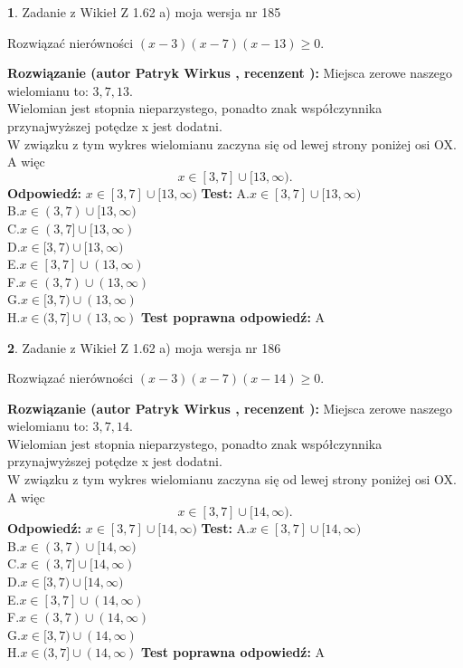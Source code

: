 \documentclass[12pt, a4paper]{article}
\theoremstyle{definition} %
\newtheorem{zad}{}
\newcommand{\zadStart}[1]{\begin{zad}#1\newline}
\newcommand{\zadStop}{\end{zad}}
\newcommand{\rozwStart}[2]{\noindent \textbf{Rozwiązanie (autor #1 , recenzent #2): }\newline}
\newcommand{\rozwStop}{\newline}
\newcommand{\odpStart}{\noindent \textbf{Odpowiedź:}\newline}
\newcommand{\odpStop}{\newline}
\newcommand{\testStart}{\noindent \textbf{Test:}\newline}
\newcommand{\testStop}{\newline}
\newcommand{\kluczStart}{\noindent \textbf{Test poprawna odpowiedź:}\newline}
\newcommand{\kluczStop}{\newline}
\begin{document}
\zadStart{Zadanie z Wikieł Z 1.62 a) moja wersja nr 185}

Rozwiązać nierówności $(x-3)(x-7)(x-13)\ge0$.
\zadStop
\rozwStart{Patryk Wirkus}{}
Miejsca zerowe naszego wielomianu to: $3, 7, 13$.\\
Wielomian jest stopnia nieparzystego, ponadto znak współczynnika przy\linebreak najwyższej potędze x jest dodatni.\\ W związku z tym wykres wielomianu zaczyna się od lewej strony poniżej osi OX. A więc $$x \in [3,7] \cup [13,\infty).$$
\rozwStop
\odpStart
$x \in [3,7] \cup [13,\infty)$
\odpStop
\testStart
A.$x \in [3,7] \cup [13,\infty)$\\
B.$x \in (3,7) \cup [13,\infty)$\\
C.$x \in (3,7] \cup [13,\infty)$\\
D.$x \in [3,7) \cup [13,\infty)$\\
E.$x \in [3,7] \cup (13,\infty)$\\
F.$x \in (3,7) \cup (13,\infty)$\\
G.$x \in [3,7) \cup (13,\infty)$\\
H.$x \in (3,7] \cup (13,\infty)$
\testStop
\kluczStart
A
\kluczStop



\zadStart{Zadanie z Wikieł Z 1.62 a) moja wersja nr 186}

Rozwiązać nierówności $(x-3)(x-7)(x-14)\ge0$.
\zadStop
\rozwStart{Patryk Wirkus}{}
Miejsca zerowe naszego wielomianu to: $3, 7, 14$.\\
Wielomian jest stopnia nieparzystego, ponadto znak współczynnika przy\linebreak najwyższej potędze x jest dodatni.\\ W związku z tym wykres wielomianu zaczyna się od lewej strony poniżej osi OX. A więc $$x \in [3,7] \cup [14,\infty).$$
\rozwStop
\odpStart
$x \in [3,7] \cup [14,\infty)$
\odpStop
\testStart
A.$x \in [3,7] \cup [14,\infty)$\\
B.$x \in (3,7) \cup [14,\infty)$\\
C.$x \in (3,7] \cup [14,\infty)$\\
D.$x \in [3,7) \cup [14,\infty)$\\
E.$x \in [3,7] \cup (14,\infty)$\\
F.$x \in (3,7) \cup (14,\infty)$\\
G.$x \in [3,7) \cup (14,\infty)$\\
H.$x \in (3,7] \cup (14,\infty)$
\testStop
\kluczStart
A
\kluczStop
\end{document}
